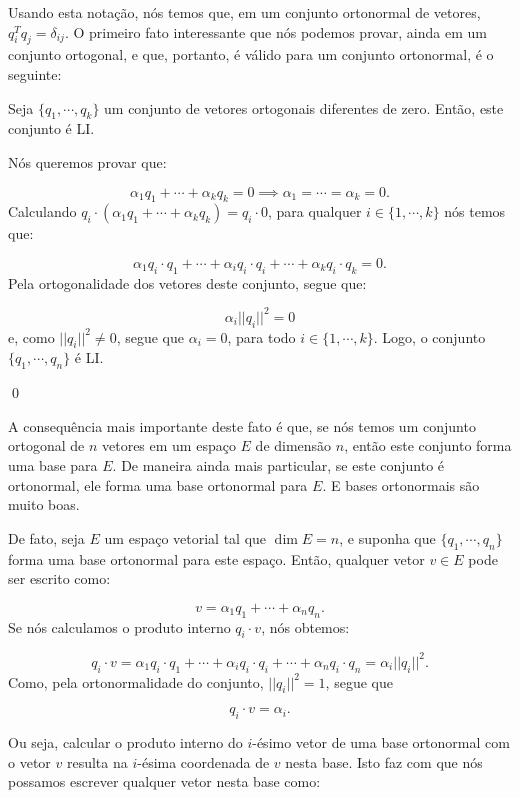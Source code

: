 Usando esta notação, nós temos que, em um conjunto ortonormal de vetores, $q_i^Tq_j = \delta_{ij}$. O primeiro fato interessante que nós podemos provar, ainda em um conjunto ortogonal, e que, portanto, é válido para um conjunto ortonormal, é o seguinte:

\begin{Proposition}
	Seja $\{q_1, \cdots, q_k\}$ um conjunto de vetores ortogonais diferentes de zero. Então, este conjunto é LI.
\end{Proposition}

\begin{Proof}
	Nós queremos provar que:
	
	$$
	\alpha_1q_1 + \cdots + \alpha_kq_k = 0\implies \alpha_1 = \cdots = \alpha_k = 0.
	$$
	Calculando $q_i\cdot(\alpha_1q_1 + \cdots + \alpha_kq_k) = q_i\cdot0$, para qualquer $i\in\{1,\cdots, k\}$ nós temos que:
	
	$$
	\alpha_1q_i\cdot q_1 + \cdots + \alpha_iq_i\cdot q_i + \cdots + \alpha_kq_i\cdot q_k = 0.
	$$
	Pela ortogonalidade dos vetores deste conjunto, segue que:
	
	$$
	\alpha_i||q_i||^2 = 0
	$$
	e, como $||q_i||^2\neq 0$, segue que $\alpha_i = 0$, para todo $i\in\{1,\cdots, k\}$. Logo, o conjunto $\{q_1, \cdots, q_n\}$ é LI.
	
	\qed
\end{Proof}

A consequência mais importante deste fato é que, se nós temos um conjunto ortogonal de $n$ vetores em um espaço $E$ de dimensão $n$, então este conjunto forma uma base para $E$. De maneira ainda mais particular, se este conjunto é ortonormal, ele forma uma base ortonormal para $E$. E bases ortonormais são muito boas.

De fato, seja $E$ um espaço vetorial tal que $\dim E = n$, e suponha que $\{q_1, \cdots, q_n\}$ forma uma base ortonormal para este espaço. Então, qualquer vetor $v\in E$ pode ser escrito como:

$$
v = \alpha_1q_1 + \cdots + \alpha_nq_n.
$$
Se nós calculamos o produto interno $q_i\cdot v$, nós obtemos:

$$
q_i\cdot v = \alpha_1q_i\cdot q_1 + \cdots + \alpha_iq_i\cdot q_i + \cdots +\alpha_nq_i\cdot q_n = \alpha_i||q_i||^2.
$$
Como, pela ortonormalidade do conjunto, $||q_i||^2 = 1$, segue que

$$
q_i\cdot v = \alpha_i.
$$

Ou seja, calcular o produto interno do $i$-ésimo vetor de uma base ortonormal com o vetor $v$ resulta na $i$-ésima coordenada de $v$ nesta base. Isto faz com que nós possamos escrever qualquer vetor nesta base como:

